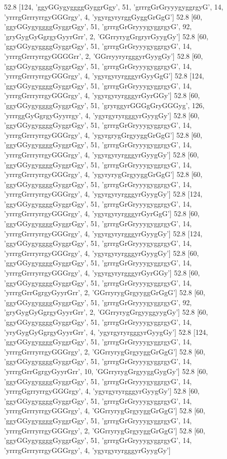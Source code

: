 52.8 [124, 'ggyGGygyggggGyggrGgy', 51, 'grrrgGrGryyygyggrgyG', 14, 'yrrrgGrrryrrgyGGGrgy', 4, 'ygyrgyryrggGyggGrGgG']
52.8 [60, 'ggyGGygyggggGyggrGgy', 51, 'grrrgGrGryyygyggrgyG', 92, 'gryGygGyGgrgyGyyrGrr', 2, 'GGrryrygGrgryrGyygGy']
52.8 [60, 'ggyGGygyggggGyggrGgy', 51, 'grrrgGrGryyygyggrgyG', 14, 'yrrrgGrrryrrgyGGGGrr', 2, 'GGrryyryrgggyrGyygGy']
52.8 [60, 'ggyGGygyggggGyggrGgy', 51, 'grrrgGrGryyygyggrgyG', 14, 'yrrrgGrrryrrgyGGGrgy', 4, 'ygyrgyryrgggyrGyyGgG']
52.8 [124, 'ggyGGygyggggGyggrGgy', 51, 'grrrgGrGryyygyggrgyG', 14, 'yrrrgGrrryrrgyGGGrgy', 4, 'ygyrgyryrgggyrGyrGGy']
52.8 [60, 'ggyGGygyggggGyggrGgy', 51, 'gryrggyrGGGgGryGGGyg', 126, 'yrrrggGyGgrgyGyyrrgy', 4, 'ygyrgyryrgggyrGyygGy']
52.8 [60, 'ggyGGygyggggGyggrGgy', 51, 'grrrgGrGryyygyggrgyG', 14, 'yrrrgGrrryrrgyGGGrgy', 4, 'ygyrgrygGrgyyggGrGgG']
52.8 [60, 'ggyGGygyggggGyggrGgy', 51, 'grrrgGrGryyygyggrgyG', 14, 'yrrrgGrrryrrgyGGGrgy', 4, 'ygyrgyryrgggyrGyygGy']
52.8 [60, 'ggyGGygyggggGyggrGgy', 51, 'grrrgGrGryyygyggrgyG', 14, 'yrrrgGrrryrrgyGGGrgy', 4, 'ygyryrygGrgyyggGrGgG']
52.8 [60, 'ggyGGygyggggGyggrGgy', 51, 'grrrgGrGryyygyggrgyG', 14, 'yrrrgGrrryrrgyGGGrgy', 4, 'ygyrgyryrgggyrGyygGy']
52.8 [124, 'ggyGGygyggggGyggrGgy', 51, 'grrrgGrGryyygyggrgyG', 14, 'yrrrgGrrryrrgyGGGrgy', 4, 'ygyrgyryrgggyrGyrGgG']
52.8 [60, 'ggyGGygyggggGyggrGgy', 51, 'grrrgGrGryyygyggrgyG', 14, 'yrrrgGrrryrrgyGGGrgy', 4, 'ygyrgyryrgggyrGyygGy']
52.8 [124, 'ggyGGygyggggGyggrGgy', 51, 'grrrgGrGryyygyggrgyG', 14, 'yrrrgGrrryrrgyGGGrgy', 4, 'ygyrgyryrgggyrGyygGy']
52.8 [60, 'ggyGGygyggggGyggrGgy', 51, 'grrrgGrGryyygyggrgyG', 14, 'yrrrgGrrryrrgyGGGrgy', 4, 'ygyrgyryrgggyrGyrGGy']
52.8 [60, 'ggyGGygyggggGyggrGgy', 51, 'grrrgGrGryyygyggrgyG', 14, 'yrrrgGrrGgrgyGyyrGrr', 2, 'GGrryrygGrgyyggGrGgG']
52.8 [60, 'ggyGGygyggggGyggrGgy', 51, 'grrrgGrGryyygyggrgyG', 92, 'gryGygGyGgrgyGyyrGrr', 2, 'GGrryrygGrgyyggyygGy']
52.8 [60, 'ggyGGygyggggGyggrGgy', 51, 'grrrgGrGryyygyggrgyG', 14, 'yryGygGyGgrgyGyyrGrr', 4, 'ygyrgyryrgggyrGyygGy']
52.8 [124, 'ggyGGygyggggGyggrGgy', 51, 'grrrgGrGryyygyggrgyG', 14, 'yrrrgGrrryrrgyGGGrgy', 2, 'GGrryrygGrgyyggGrGgG']
52.8 [60, 'ggyGGygyggggGyggrGgy', 51, 'grrrgGrGryyygyggrgyG', 14, 'yrrrgGrrGgrgyGyyrGrr', 10, 'GGrryrygGrgyyggGygGy']
52.8 [60, 'ggyGGygyggggGyggrGgy', 51, 'grrrgGrGryyygyggrgyG', 14, 'yrrrgGgrryrrgyGGGrgy', 4, 'ygyrgyryrgggyrGyygGy']
52.8 [60, 'ggyGGygyggggGyggrGgy', 51, 'grrrgGrGryyygyggrgyG', 14, 'yrrrgGrrryrrgyGGGrgy', 4, 'GGrryrygGrgyyggGrGgG']
52.8 [60, 'ggyGGygyggggGyggrGgy', 51, 'grrrgGrGryyygyggrgyG', 14, 'yrrrgGrrryrrgyGGGrgy', 2, 'GGrryrygGrgyyggGrGgG']
52.8 [60, 'ggyGGygyggggGyggrGgy', 51, 'grrrgGrGryyygyggrgyG', 14, 'yrrrgGrrryrrgyGGGrgy', 4, 'ygyrgyryrgggyrGyygGy']
